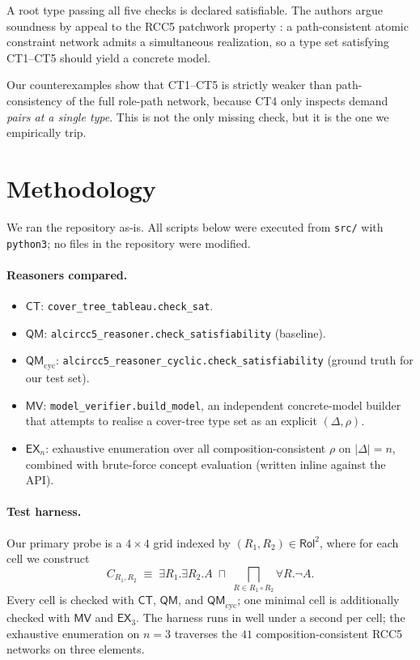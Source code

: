 \documentclass[]{ceurart}
\newcommand{\comp}{\circ}
\theoremstyle{definition}
\theoremstyle{remark}
\begin{document}
A root type passing all five checks is declared satisfiable. The
authors argue soundness by appeal to the RCC5 patchwork property
\cite{renz1999}: a path-consistent atomic constraint network admits
a simultaneous realization, so a type set satisfying CT1--CT5 should
yield a concrete model.

Our counterexamples show that CT1--CT5 is strictly weaker than
path-consistency of the full role-path network, because CT4 only
inspects demand \emph{pairs at a single type}. This is not the only
missing check, but it is the one we empirically trip.

\section{Methodology}
\label{sec:methodology}

We ran the repository as-is. All scripts below were executed from
\verb|src/| with \verb|python3|; no files in the repository were
modified.

\paragraph{Reasoners compared.}
\begin{itemize}
  \item $\mathsf{CT}$: \verb|cover_tree_tableau.check_sat|.
  \item $\mathsf{QM}$: \verb|alcircc5_reasoner.check_satisfiability| (baseline).
  \item $\mathsf{QM}_{\mathrm{cyc}}$: \verb|alcircc5_reasoner_cyclic.check_satisfiability|
    (ground truth for our test set).
  \item $\mathsf{MV}$: \verb|model_verifier.build_model|, an independent concrete-model
    builder that attempts to realise a cover-tree type set as an
    explicit $(\Delta, \rho)$.
  \item $\mathsf{EX}_n$: exhaustive enumeration over all
    composition-consistent $\rho$ on $|\Delta| = n$, combined with
    brute-force concept evaluation (written inline against the API).
\end{itemize}

\paragraph{Test harness.}
Our primary probe is a $4 \!\times\! 4$ grid indexed by
$(R_1, R_2) \in \mathsf{Rol}^2$, where for each cell we construct
\[
  C_{R_1, R_2} \;\equiv\; \exists R_1 . \exists R_2 . A
    \;\sqcap\; \bigsqcap_{R \in R_1 \comp R_2}
    \forall R . \neg A.
\]
Every cell is checked with $\mathsf{CT}$, $\mathsf{QM}$, and
$\mathsf{QM}_{\mathrm{cyc}}$; one minimal cell is additionally
checked with $\mathsf{MV}$ and $\mathsf{EX}_3$. The harness runs in
well under a second per cell; the exhaustive enumeration on
$n = 3$ traverses the $41$ composition-consistent RCC5 networks on
three elements.
\end{document}
